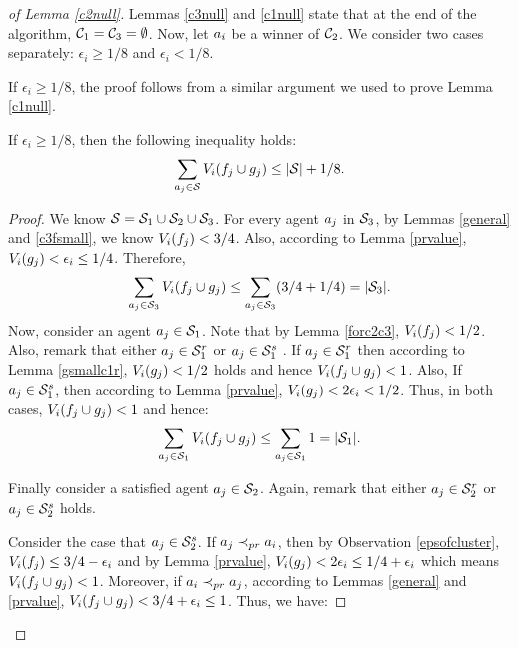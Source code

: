 
\begin{proof}[of Lemma \ref{c2null}]
Lemmas \ref{c3null} and \ref{c1null} state that at the end of the algorithm, $\mathcal{C}_1 = \mathcal{C}_3 = \emptyset$. Now, let $a_i$ be a winner of $\mathcal{C}_2$. We consider two cases separately: $\epsilon_i \geq {1/8}$ and $\epsilon_i < {1/8}$.

If $\epsilon_i \geq{1/8}$, the proof follows from a similar argument we used to prove Lemma \ref{c1null}. 

\begin{lemma}
\label{c2rem}
If $\epsilon_i \geq 1/8$, then the following inequality holds:
$$ \sum_{a_j \in \mathcal{S}} V_i( f_j \cup g_j) \leq |\mathcal{S}| + 1/8.$$
\end{lemma}
\begin{proof}
We know $\mathcal{S} = \mathcal{S}_1 \cup \mathcal{S}_2 \cup \mathcal{S}_3$. For every agent $a_j$ in $\mathcal{S}_3$, by Lemmas \ref{general} and \ref{c3fsmall}, we know $V_i(f_j)<3/4$. Also, according to Lemma \ref{prvalue}, $V_i(g_j)< \epsilon_i \leq 1/4$. Therefore,
\begin{equation}
\label{bow}
\sum_{a_j \in \mathcal{S}_3} V_i(f_j \cup g_j) \leq \sum_{a_j \in \mathcal{S}_3} (3/4 + 1/4) = |\mathcal{S}_3|.
\end{equation} 
Now, consider an agent $a_j \in \mathcal{S}_1$. Note that by Lemma \ref{forc2c3}, $V_i(f_j)< 1/2$. Also, remark that either $a_j \in \mathcal{S}_1^r$  or $a_j \in \mathcal{S}_1^s$ . If $a_j \in \mathcal{S}_1^r$ then according to Lemma \ref{gsmallc1r}, $V_i(g_j)< 1/2$ holds and hence $V_i(f_j \cup g_j)< 1$. Also, If $a_j \in \mathcal{S}_1^s$, then according to Lemma \ref{prvalue}, $V_i(g_j)<2\epsilon_i<1/2$. 
Thus, in both cases, $V_i(f_j \cup g_j)< 1$ and hence:
\begin{equation}
\label{hogh}
\sum_{a_j \in \mathcal{S}_1} V_i(f_j \cup g_j) \leq \sum_{a_j \in \mathcal{S}_1} 1 = |\mathcal{S}_1|.
\end{equation} 

Finally consider a satisfied agent $a_j \in \mathcal{S}_2$. Again, remark that either $a_j \in \mathcal{S}_2^r$  or $a_j \in \mathcal{S}_2^s$ holds. 

Consider the case that $a_j \in \mathcal{S}_2^s$. If $a_j \prec_{pr} a_i$, then by Observation \ref{epsofcluster}, $V_i(f_j) \leq 3/4 - \epsilon_i$ and by Lemma \ref{prvalue}, $V_i(g_j) < 2\epsilon_i \leq 1/4 + \epsilon_i$ which means $V_i(f_j \cup g_j) < 1$. Moreover, if $a_i \prec_{pr} a_j$, according to Lemmas \ref{general} and \ref{prvalue}, $V_i(f_j \cup g_j) < 3/4 + \epsilon_i \leq 1 $. Thus, we have:


\end{proof}
\end{proof}
